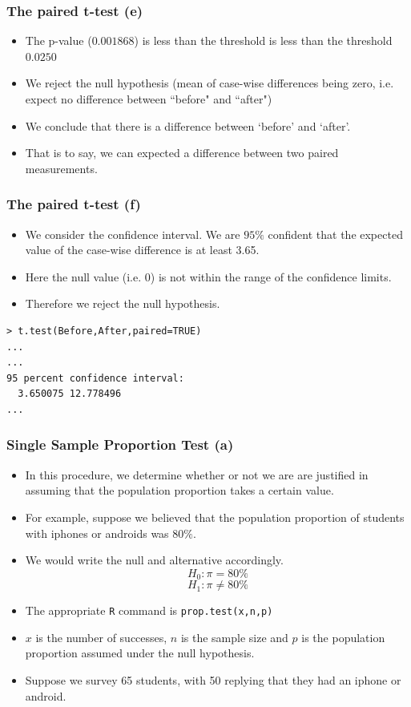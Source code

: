 \documentclass[a4]{beamer}
\begin{document}
\begin{frame}[fragile]
\frametitle{The paired t-test (e)}
\begin{itemize}
\item The p-value ($0.001868$) is less than the threshold is less than the threshold $0.0250$
\item We reject the null hypothesis (mean of case-wise differences being zero, i.e. expect no difference between ``before" and ``after")
\item We conclude that there is a difference between `before' and `after'.
\item That is to say, we can expected a difference between two paired measurements.
\end{itemize}
\end{frame}
\begin{frame}[fragile]
\frametitle{The paired t-test (f)}
\begin{itemize}
\item We consider the confidence interval. We are $95\%$ confident that the expected value of the case-wise difference is at least 3.65.
\item Here the null value (i.e. 0) is not within the range of the confidence limits.
\item Therefore we reject the null hypothesis.
\end{itemize}
\begin{verbatim}
> t.test(Before,After,paired=TRUE)
...
...
95 percent confidence interval:
  3.650075 12.778496
...
\end{verbatim}
\end{frame}
\begin{frame}[fragile]
\frametitle{Single Sample Proportion Test (a)}

\begin{itemize}
\item In this procedure, we determine whether or not we are are justified in assuming that the population proportion takes a certain value.
\item For example, suppose we believed that the population proportion of students with iphones or androids was $80\%$.
\item We would write the null and alternative accordingly.
\[H_0 : \pi = 80\% \]
\[H_1 : \pi \neq 80\% \]
\item The  appropriate \texttt{R} command is \texttt{prop.test(x,n,p)}
\item $x$ is the number of successes, $n$ is the sample size and $p$ is the population proportion assumed under the null hypothesis.
\item Suppose we survey 65 students, with 50 replying that they had an iphone or android.
\end{itemize}

\end{frame}
\end{document}
